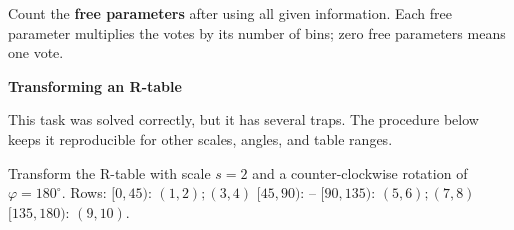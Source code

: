 \documentclass[11pt,a4paper]{article}
\newcommand{\keep}[1]{\par
  \ifdim\dimexpr\pagegoal-\pagetotal\relax<#1\relax\newpage\fi}
\newcommand{\sub}[1]{\keep{6cm}\medskip
  {\sffamily\bfseries\large\color{accent}#1}\par\smallskip}
\begin{document}
\begin{hook}
Count the \textbf{free parameters} after using all given information. Each free
parameter multiplies the votes by its number of bins; zero free parameters means
one vote.
\end{hook}

\sub{Transforming an R-table}

This task was solved correctly, but it has several traps. The procedure below
keeps it reproducible for other scales, angles, and table ranges.

\begin{question}
Transform the R-table with scale $s=2$ and a counter-clockwise rotation of
$\varphi=180^\circ$. Rows: $[0,45)$: $(1,2);(3,4)$ \quad $[45,90)$: -- \quad
$[90,135)$: $(5,6);(7,8)$ \quad $[135,180)$: $(9,10)$.
\end{question}
\end{document}
